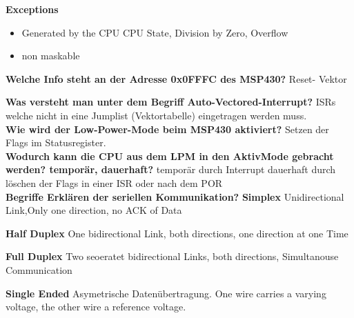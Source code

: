     \qquad \textbf{Exceptions}
    \begin{itemize}
        \item Generated by the CPU
        \subitem CPU State, Division by Zero, Overflow
        \item non maskable
    \end{itemize}

\textbf{Welche Info steht an der Adresse 0x0FFFC des MSP430?}\newline
    Reset- Vektor
    
\textbf{Was versteht man unter dem Begriff Auto-Vectored-Interrupt?}\newline
    ISRs welche nicht in eine Jumplist (Vektortabelle) eingetragen werden muss.\\

\textbf{Wie wird der Low-Power-Mode beim MSP430 aktiviert?}\newline
    Setzen der Flags im Statusregister.\\
    
\textbf{Wodurch kann die CPU aus dem LPM in den AktivMode gebracht werden? temporär, dauerhaft?}\newline
    temporär durch Interrupt \newline
    dauerhaft durch löschen der Flags in einer ISR oder nach dem POR\\
    
\textbf{Begriffe Erklären der seriellen Kommunikation?}\newline
\null\qquad \textbf{Simplex}\newline
    Unidirectional Link,Only one direction, no ACK of Data\newline
    
\qquad \textbf{Half Duplex}\newline
    One bidirectional Link, both directions, one direction at one Time\newline
    
\qquad \textbf{Full Duplex}\newline
    Two seoeratet bidirectional Links, both directions, Simultanouse Communication\newline
    
\qquad \textbf{Single Ended}\newline
    Asymetrische Datenübertragung.\newline
    One wire carries a varying voltage, the other wire a reference voltage.\newline
    
